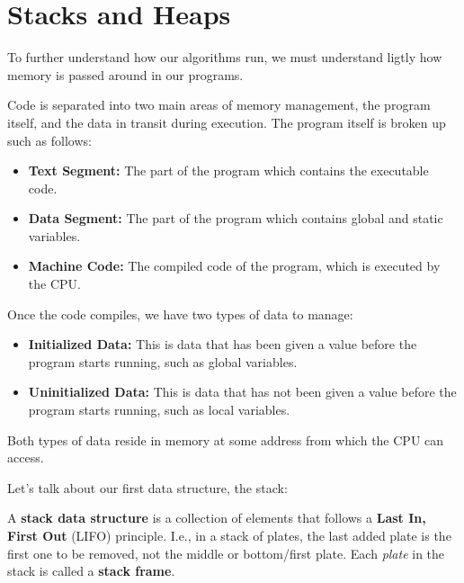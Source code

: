 \section{Stacks and Heaps}
\label{sec:stacks_heaps}

\noindent
To further understand how our algorithms run, we must understand ligtly how memory is passed around in our programs.

\begin{Def}

    Code is separated into two main areas of memory management, the program itself, and the data in transit during execution.
    The program itself is broken up such as follows:
    \begin{itemize}
        \item \textbf{Text Segment:} The part of the program which contains the executable code.
        \item \textbf{Data Segment:} The part of the program which contains global and static variables.
        \item \textbf{Machine Code:} The compiled code of the program, which is executed by the CPU.
    \end{itemize}

    \noindent
    Once the code compiles, we have two types of data to manage:
    \begin{itemize}
        \item \textbf{Initialized Data:} This is data that has been given a value before the program starts running, such as global variables.
        \item \textbf{Uninitialized Data:} This is data that has not been given a value before the program starts running, such as local variables.
    \end{itemize}
    \noindent
    Both types of data reside in memory at some address from which the CPU can access.
\end{Def}

\noindent
Let's talk about our first data structure, the stack:
\begin{Def}[Stack]

    A \textbf{stack data structure} is a collection of elements that follows a \textbf{Last In, First Out} (LIFO) principle. I.e., in a 
    stack of plates, the last added plate is the first one to be removed, not the middle or bottom/first plate.
    Each \textit{plate} in the stack is called a \textbf{stack frame}.
\end{Def}


